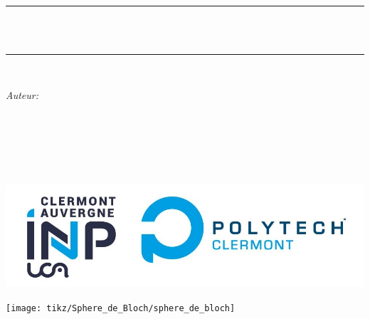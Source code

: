 
\begin{titlepage}
	\newcommand{\HRule}{\rule{\linewidth}{0.5mm}}
	\centering 
	\quad\\[1.5cm]
	
	
	\makeatletter
	\HRule \\[0.4cm]
	{ \huge \bfseries \@title}\\[0.4cm] 
	\HRule \\[1.5cm]
	\begin{minipage}{0.4\textwidth}
		\begin{flushleft} \large
			\emph{Auteur:}\\
			\@author 
		\end{flushleft}
	\end{minipage}
	~
	\begin{minipage}{0.4\textwidth}
		\begin{flushright} \large
			\emph{} \\
			\textup{}
		\end{flushright}
	\end{minipage}\\[1cm]
	\makeatother	
	
	\includegraphics[width=0.4\linewidth]{first_page/logo_inp_polytech_2023_rvb.jpg}
	
	
	
	
	\vspace{2cm}
	


	\texttt{[image: tikz/Sphere\_de\_Bloch/sphere\_de\_bloch]}




	
	
	
	
	
	
	
	
	
	
	\vfill 
	
\end{titlepage}

